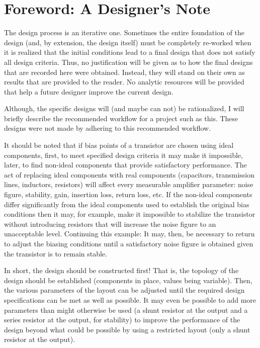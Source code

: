 \section{Foreword: A Designer's Note}
\label{sec:Foreword}
The design process is an iterative one. Sometimes the entire foundation of the
design (and, by extension, the design itself) must be completely re-worked when
it is realized that the initial conditions lead to a final design that does not
satisfy all design criteria. Thus, no justification will be given as to how the
final designs that are recorded here were obtained. Instead, they will stand on
their own as results that are provided to the reader. No analytic resources will
be provided that help a future designer improve the current design.

Although, the specific designs will (and maybe can not) be rationalized, I will
briefly describe the recommended workflow for a project such as this. These
designs were not made by adhering to this recommended workflow.

It should be noted that if bias points of a transistor are chosen using ideal
components, first, to meet specified design criteria it may make it impossible,
later, to find non-ideal components that provide satisfactory performance. The
act of replacing ideal components with real components (capacitors, transmission
lines, inductors, resistors) will affect every measurable amplifier parameter:
noise figure, stability, gain, insertion loss, return loss, etc. If the
non-ideal components differ significantly from the ideal components used to
establish the original bias conditions then it may, for example, make it
impossible to stabilize the transistor without introducing resistors that will
increase the noise figure to an unacceptable level. Continuing this example: It
may, then, be necessary to return to adjust the biasing conditions until a
satisfactory noise figure is obtained given the transistor is to remain stable.

In short, the design should be constructed first! That is, the topology of the
design should be established (components in place, values being variable). Then,
the various parameters of the layout can be adjusted until the required design
specifications can be met as well as possible. It may even be possible to add
more parameters than might otherwise be used (a shunt resistor at the output and
a series resistor at the output, for stability) to improve the performance of
the design beyond what could be possible by using a restricted layout (only a
shunt resistor at the output).
